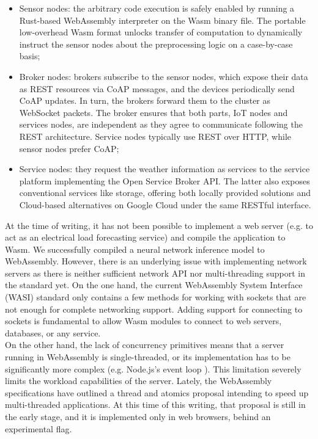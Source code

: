 \begin{itemize}
    \item Sensor nodes: the arbitrary code execution is safely enabled by running a Rust-based WebAssembly interpreter on the Wasm binary file. The portable low-overhead Wasm format unlocks transfer of computation to dynamically instruct the sensor nodes about the preprocessing logic on a case-by-case basis;
    \item Broker nodes: brokers subscribe to the sensor nodes, which expose their data as REST resources via CoAP messages, and the devices periodically send CoAP updates. In turn, the brokers forward them to the cluster as WebSocket packets. The broker ensures that both parts, IoT nodes and services nodes, are independent as they agree to communicate following the REST architecture. Service nodes typically use REST over HTTP, while sensor nodes prefer CoAP;
    \item Service nodes: they request the weather information as services to the service platform implementing the Open Service Broker API. The latter also exposes conventional services like storage, offering both locally provided solutions and Cloud-based alternatives on Google Cloud under the same RESTful interface. 
\end{itemize}

At the time of writing, it has not been possible to implement a web server (e.g. to act as an electrical load forecasting service) and compile the application to Wasm. We successfully compiled a neural network inference model to WebAssembly. However, there is an underlying issue with implementing network servers as there is neither sufficient network API nor multi-threading support in the standard yet.
On the one hand, the current WebAssembly System Interface (WASI) standard only contains a few methods for working with sockets that are not enough for complete networking support. Adding support for connecting to sockets is fundamental to allow Wasm modules to connect to web servers, databases, or any service. \\
On the other hand, the lack of concurrency primitives means that a server running in WebAssembly is single-threaded, or its implementation has to be significantly more complex (e.g. Node.js's event loop \cite{nodejs-event-loop}). This limitation severely limits the workload capabilities of the server. 
Lately, the WebAssembly specifications have outlined a thread and atomics proposal intending to speed up multi-threaded applications. At this time of this writing, that proposal is still in the early stage, and it is implemented only in web browsers, behind an experimental flag.

